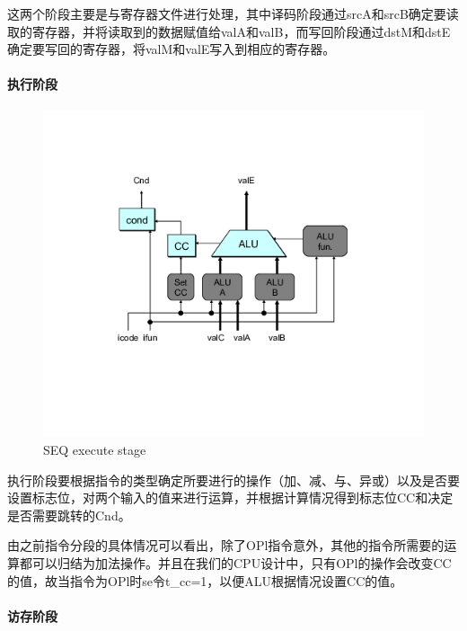 \documentclass[12pt]{article}
\begin{document}
\begin{CJK*}{GB}{gbsn}
这两个阶段主要是与寄存器文件进行处理，其中译码阶段通过srcA和srcB确定要读取的寄存器，并将读取到的数据赋值给valA和valB，而写回阶段通过dstM和dstE确定要写回的寄存器，将valM和valE写入到相应的寄存器。

\paragraph{执行阶段}\label{ux6267ux884cux9636ux6bb5}

\begin{figure}[htbp]
\centering
\includegraphics{img/seq-execute.png}
\caption{SEQ execute stage}
\end{figure}

执行阶段要根据指令的类型确定所要进行的操作（加、减、与、异或）以及是否要设置标志位，对两个输入的值来进行运算，并根据计算情况得到标志位CC和决定是否需要跳转的Cnd。

由之前指令分段的具体情况可以看出，除了OPl指令意外，其他的指令所需要的运算都可以归结为加法操作。并且在我们的CPU设计中，只有OPl的操作会改变CC的值，故当指令为OPl时se令t\_cc=1，以便ALU根据情况设置CC的值。

\paragraph{访存阶段}\label{ux8bbfux5b58ux9636ux6bb5}


\end{CJK*}
\end{document}
